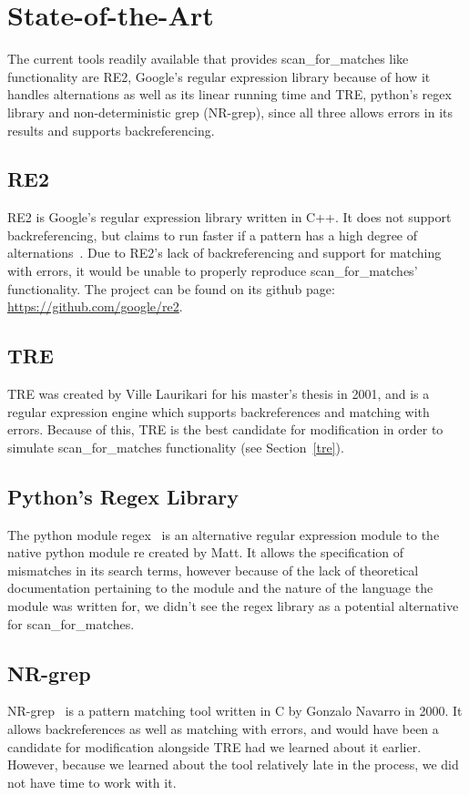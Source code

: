 \section{State-of-the-Art}
The current tools readily available that provides scan\_for\_matches like 
functionality are RE2, Google's regular expression library because of 
how it handles alternations as well as its linear running time and TRE, 
python's regex library and non-deterministic grep (NR-grep), since all three 
allows errors in its results and supports backreferencing. %
 \subsection{RE2} %
 RE2 is Google's regular expression library written in C++. It does not 
 support backreferencing, but claims to run faster if a pattern has a high degree 
 of alternations~\cite{javare2}. Due to RE2's lack of backreferencing and support for 
 matching with errors, it would be unable to properly reproduce 
 scan\_for\_matches' functionality. The project can be found on its github 
 page: \url{https://github.com/google/re2}.
 \subsection{TRE} %
 TRE was created by Ville Laurikari for his master's thesis in 
 2001\cite{LaurikariComplex}, and is a regular expression engine which supports 
 backreferences and matching with errors. Because of this, TRE is the best 
 candidate for modification in order to simulate scan\_for\_matches 
 functionality (see Section~\ref{tre}).
 \subsection{Python's Regex Library} %
 The python module regex~\cite{pythonregex} is an alternative regular expression 
 module to the native python module re created by Matt. It allows the 
 specification of mismatches in its search terms, however because of the lack 
 of theoretical documentation pertaining to the module and the nature of 
 the language the module was written for, we didn't see the regex library as 
 a potential alternative for scan\_for\_matches. 
 \subsection{NR-grep}
 NR-grep~\cite{Navarro00nr-grep:a} is a pattern matching tool written 
 in C by Gonzalo Navarro in 2000. It allows backreferences as well as matching 
 with errors, and would have been a candidate for modification alongside TRE had 
 we learned about it earlier. However, because we learned about the tool 
 relatively late in the process, we did not have time to work with it.
